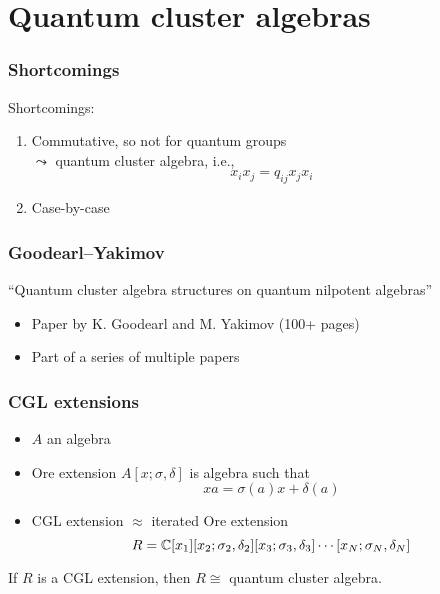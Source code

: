 \documentclass[aspectratio=169]{beamer}
\begin{document}
\section{Quantum cluster algebras}

\begin{frame}
	\frametitle{Shortcomings}

	Shortcomings:
	\begin{enumerate}
		\item Commutative, so not for quantum groups\\ \pause $\leadsto$ quantum cluster algebra,
		      i.e.,
		      \begin{equation*}
			      x_i x_j = q_{ij} x_j x_i
		      \end{equation*}%
		      \pause
		\item Case-by-case
	\end{enumerate}

\end{frame}

\begin{frame}
	\frametitle{Goodearl--Yakimov}

	\begin{center}
		``Quantum cluster algebra structures on quantum nilpotent algebras''
	\end{center}
	\begin{itemize}
		\item Paper by K. Goodearl and M. Yakimov (100+ pages)
		\item Part of a series of multiple papers
	\end{itemize}

\end{frame}

\begin{frame}
	\frametitle{CGL extensions}
	\begin{itemize}
		\item $A$ an algebra
		\item Ore extension $A[x; \sigma, \delta]$ is algebra such that
		      \begin{equation*}
			      x a = \sigma(a) x + \delta(a)
		      \end{equation*}
		\item CGL extension $\approx$ iterated Ore extension
		      \begin{equation*}
			      R = \mathbb{C}[x_1][x_2; \sigma_2, \delta_2][x_3; \sigma_3, \delta_3] \dotsb [x_N; \sigma_N, \delta_N]
		      \end{equation*}
	\end{itemize}
	\begin{theorem}
		If $R$ is a CGL extension, then $R \cong$ quantum cluster algebra.
	\end{theorem}

\end{frame}
\end{document}
